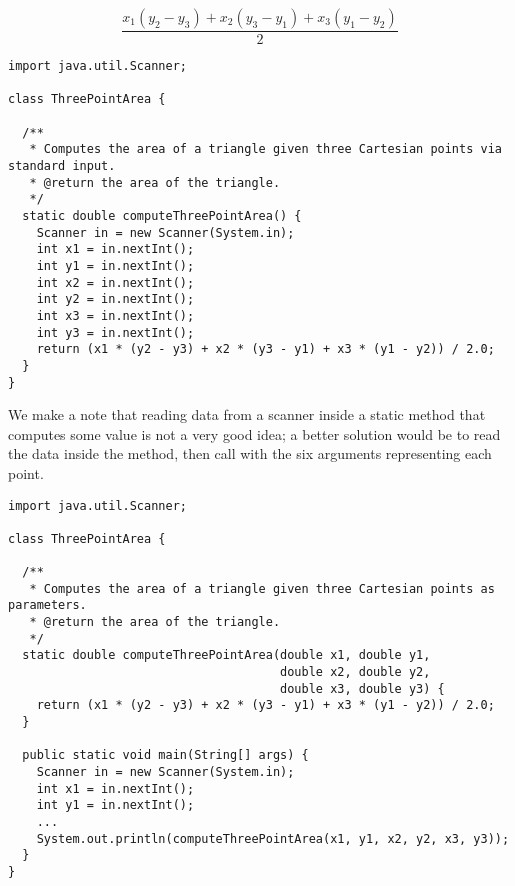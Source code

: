 \[
\dfrac{x_1(y_2 - y_3) + x_2(y_3 - y_1) + x_3 (y_1 - y_2)}{2}
\]
\begin{cl}[]{}
\begin{lstlisting}[language=MyJava]
import java.util.Scanner;

class ThreePointArea {

  /**
   * Computes the area of a triangle given three Cartesian points via standard input.
   * @return the area of the triangle.
   */
  static double computeThreePointArea() {
    Scanner in = new Scanner(System.in);
    int x1 = in.nextInt();
    int y1 = in.nextInt();
    int x2 = in.nextInt();
    int y2 = in.nextInt();
    int x3 = in.nextInt();
    int y3 = in.nextInt();
    return (x1 * (y2 - y3) + x2 * (y3 - y1) + x3 * (y1 - y2)) / 2.0;
  }
}
\end{lstlisting}
\end{cl}
We make a note that reading data from a scanner inside a static method that computes some value is not a very good idea; a better solution would be to read the data inside the  method, then call  with the six arguments representing each point.
\begin{cl}[]{}
\begin{lstlisting}[language=MyJava]
import java.util.Scanner;

class ThreePointArea {
  
  /**
   * Computes the area of a triangle given three Cartesian points as parameters.
   * @return the area of the triangle.
   */
  static double computeThreePointArea(double x1, double y1,
                                      double x2, double y2,
                                      double x3, double y3) {
    return (x1 * (y2 - y3) + x2 * (y3 - y1) + x3 * (y1 - y2)) / 2.0;
  }

  public static void main(String[] args) {
    Scanner in = new Scanner(System.in);
    int x1 = in.nextInt();
    int y1 = in.nextInt();
    ...
    System.out.println(computeThreePointArea(x1, y1, x2, y2, x3, y3));
  }
}
\end{lstlisting}
\end{cl}

